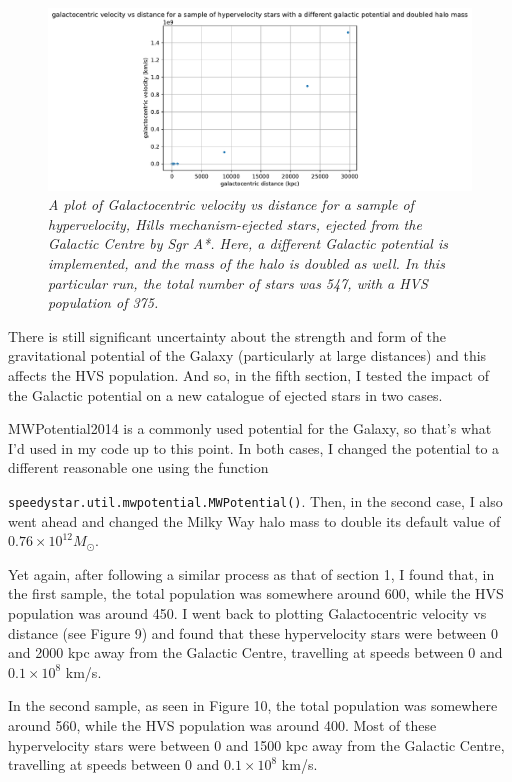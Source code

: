 \documentclass{article}
\begin{document}
\begin{figure}[h!]
\caption{\textit{A plot of Galactocentric velocity vs distance for a sample of hypervelocity, Hills mechanism-ejected stars, ejected from the Galactic Centre by Sgr A*. Here, a different Galactic potential is implemented, and the mass of the halo is doubled as well. In this particular run, the total number of stars was 547, with a HVS population of 375.}}
\includegraphics[width=1.1\textwidth]{GCv_vs_GCdist_hyp_5b.pdf}
\end{figure}

There is still significant uncertainty about the strength and form of the gravitational potential of the Galaxy (particularly at large distances) and this affects the HVS population. And so, in the fifth section, I tested the impact of the Galactic potential on a new catalogue of ejected stars in two cases. 

MWPotential2014 is a commonly used potential for the Galaxy, so that's what I'd used in my code up to this point. In both cases, I changed the potential to a different reasonable one using the function 

\noindent\texttt{speedystar.util.mwpotential.MWPotential()}. Then, in the second case, I also went ahead and changed the Milky Way halo mass to double its default value of $0.76 \times 10^{12} M_{\odot}$.

\vspace{1cm}

Yet again, after following a similar process as that of section 1, I found that, in the first sample, the total population was somewhere around 600, while the HVS population was around 450. I went back to plotting Galactocentric velocity vs distance (see Figure 9) and found that these hypervelocity stars were between 0 and 2000 kpc away from the Galactic Centre, travelling at speeds between 0 and $0.1 \times 10^8$ km/s. 

In the second sample, as seen in Figure 10, the total population was somewhere around 560, while the HVS population was around 400. Most of these hypervelocity stars were between 0 and 1500 kpc away from the Galactic Centre, travelling at speeds between 0 and $0.1 \times 10^8$ km/s. 
\end{document}
